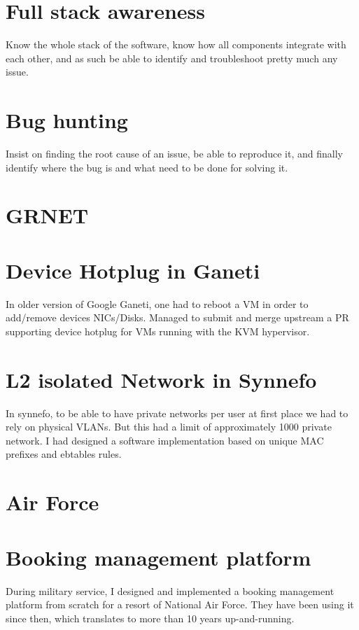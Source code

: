 \documentclass[margin,centered]{res}
\begin{document}
\begin{resume}
\section{\sc Full stack awareness}
Know the whole stack of the software, know how all components integrate with
each other, and as such be able to identify and troubleshoot pretty much any
issue.

\section{\sc Bug hunting}
Insist on finding the root cause of an issue, be able to reproduce it, and
finally identify where the bug is and what need to be done for solving it.


\section{GRNET}

\section{\sc Device Hotplug in Ganeti}
In older version of Google Ganeti, one had to reboot a VM in order to
add/remove devices NICs/Disks. Managed to submit and merge upstream a PR
supporting device hotplug for VMs running with the KVM hypervisor.

\section{\sc L2 isolated Network in Synnefo}
In synnefo, to be able to have private networks per user at first place we
had to rely on physical VLANs. But this had a limit of approximately 1000
private network. I had designed a software implementation based on unique MAC
prefixes and ebtables rules.

\section{Air Force}

\section{\sc Booking management platform}
During military service, I designed and implemented a booking management
platform from scratch for a resort of National Air Force. They have been using
it since then, which translates to more than 10 years up-and-running.


\end{resume}
\end{document}
